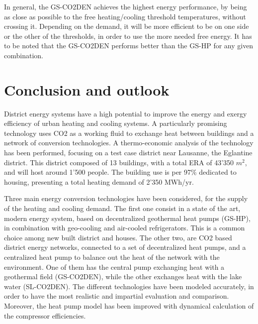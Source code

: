 \documentclass{article}
\begin{document}
In general, the GS-CO2DEN achieves the highest energy performance, by being as close as possible to the free heating/cooling threshold temperatures, without crossing it. Depending on the demand, it will be more efficient to be on one side or the other of the thresholds, in order to use the more needed free energy. It has to be noted that the GS-CO2DEN performs better than the GS-HP for any given combination. 

\section{Conclusion and outlook}
District energy systems have a high potential to improve the energy and exergy efficiency of urban heating and cooling systems. A particularly promising technology uses CO2 as a working fluid to exchange heat between buildings and a network of conversion technologies. A thermo-economic analysis of the technology has been performed, focusing on a test case district near Lausanne, the Eglantine district. This district composed of 13 buildings, with a total ERA of  43'350 $m^2$, and will host around 1'500 people. The building use is per 97\% dedicated to housing, presenting a total heating demand of 2'350 MWh/yr.

Three main energy conversion technologies have been considered, for the supply of the heating and cooling demand. The first one consist in a state of the art, modern energy system, based on decentralized geothermal heat pumps (GS-HP), in combination with geo-cooling and air-cooled refrigerators. This is a common choice among new built district and houses. The other two, are CO2 based district energy networks, connected to a set of decentralized heat pumps, and a centralized heat pump to balance out the heat of the network with the environment. One of them has the central pump exchanging heat with a geothermal field (GS-CO2DEN), while the other exchanges heat with the lake water (SL-CO2DEN). The different technologies have been modeled accurately, in order to have the most realistic and impartial evaluation and comparison. Moreover, the heat pump model has been improved with dynamical calculation of the compressor efficiencies.\\
\end{document}
